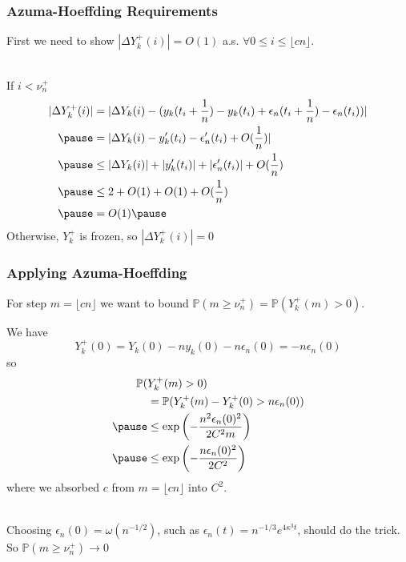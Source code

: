 \documentclass{beamer}
\begin{document}
\begin{frame}
  \frametitle{Azuma-Hoeffding Requirements}
  First we need to show \(|\Delta Y_{k}^{+}(i)| = O(1)\) a.s. \(\forall 0 \leq i \leq \lfloor {cn} \rfloor\). \\~\ \pause

  If \(i < \nu_{n}^{+}\)
  \[
    \begin{aligned}
        |\Delta Y_{k}^{+}(i)| &= |\Delta Y_{k}(i) - (y_{k}(t_{i} + \frac{1}{n}) - y_{k}(t_{i}) + \epsilon_{n}(t_{i} + \frac{1}{n}) - \epsilon_{n}(t_{i}))| \\ \pause
        &= |\Delta Y_{k}(i) - y_{k}'(t_{i}) - \epsilon_{n}'(t_{i}) + O(\frac{1}{n})| \\ \pause
        &\leq |\Delta Y_{k}(i)| + |y_{k}'(t_{i})| + |\epsilon_{n}'(t_{i})| + O(\frac{1}{n}) \\ \pause
        &\leq 2 + O(1) + O(1) + O(\frac{1}{n}) \\ \pause
        &= O(1) \pause
    \end{aligned}
  \]
  Otherwise, \(Y_{k}^{+}\) is frozen, so \(|\Delta Y_{k}^{+}(i)| = 0\)
  
\end{frame}

\begin{frame}
  \frametitle{Applying Azuma-Hoeffding}
  For step \(m = \lfloor {cn} \rfloor\) we want to bound \(\mathbb{P}(m \geq \nu_{n}^{+}) = \mathbb{P}(Y_{k}^{+}(m) > 0)\). \pause

  We have
  \[
    Y_{k}^{+}(0) = Y_{k}(0) - ny_{k}(0) - n\epsilon_{n}(0) = -n\epsilon_{n}(0)
  \] \pause
  so
  \[
    \begin{aligned}
      \mathbb{P}(&Y_{k}^{+}(m) > 0) \\
      &= \mathbb{P}(Y_{k}^{+}(m) - Y_{k}^{+}(0) > n\epsilon_{n}(0)) \\ \pause
      &\leq  \exp\left( - \frac{ n^{2}\epsilon_{n}(0)^{2} }{2 C^{2}m} \right) \\  \pause
      &\leq \exp\left( - \frac{n \epsilon_{n}(0)^{2}}{2 C^{2}} \right) \\ 
    \end{aligned}
  \]
  where we absorbed \(c\) from \(m = \lfloor {cn} \rfloor\) into \(C^{2}\). \pause \\~\ 
  
  Choosing \(\epsilon_{n}(0) = \omega(n^{-1/2})\), such as \(\epsilon_{n}(t) = n^{-1/3}e^{4 \kappa^{3}t}\), should do the trick. So \(\mathbb{P}(m \geq \nu_{n}^{+}) \to 0\)
  
\end{frame}
\end{document}
